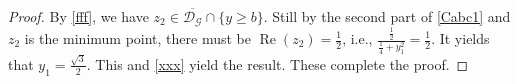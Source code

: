 \documentclass[10pt,a4paper]{amsart}
\renewcommand{\Re}{\operatorname{Re}}
\begin{document}
\begin{proof}
By \eqref{fff}, we have $z_2\in\overline{\mathcal{D}_{\mathcal{G}}}\cap\{y\geq b\}$. Still by the second part of \eqref{Cabc1} and $z_2$ is the minimum point, there must be $\Re(z_2)=\frac{1}{2}$, i.e., $\frac{\frac{1}{2}}{\frac{1}{4}+y_1^2}=\frac{1}{2}$. It yields that $y_1=\frac{\sqrt3}{2}$. This and \eqref{xxx} yield the result. These complete the proof.


\end{proof}
\end{document}
